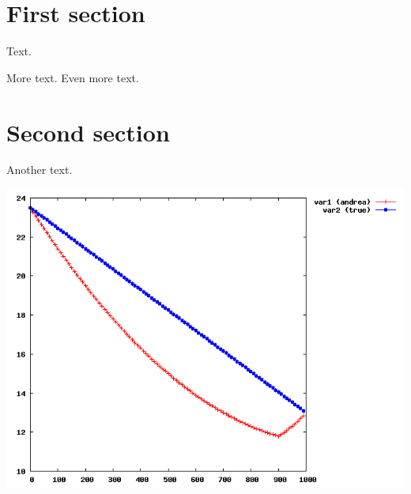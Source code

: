 \documentclass[a4paper,twoside,11pt]{article}
\begin{document}
\section{First section}

Text.

More text.
Even more text.

\section{Second section}

Another text.

\includegraphics[width=\textwidth]{chart}
\end{document}
